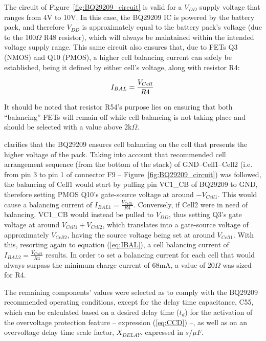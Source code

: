 The circuit of Figure~\ref{fig:BQ29209_circuit} is valid for a $V_{DD}$ supply voltage that ranges from 4V to 10V. In this case, the BQ29209 IC is powered by the battery pack, and therefore $V_{DD}$ is approximately equal to the battery pack's voltage (due to the 100$\Omega$ R48 resistor), which will always be maintained within the intended voltage supply range. This same circuit also ensures that, due to FETs Q3 (NMOS) and Q10 (PMOS), a higher cell balancing current can safely be established, being it defined by either cell's voltage, along with resistor R4:

\begin{equation}\label{eq:IBAL}
	I_{BAL}=\frac{V_{Cell}}{R4}\,\medskip
\end{equation}

\noindent It should be noted that resistor R54's purpose lies on ensuring that both ``balancing'' FETs will remain off while cell balancing is not taking place and should be selected with a value above 2k$\Omega$.

\cite{bq29209} clarifies that the BQ29209 ensures cell balancing on the cell that presents the higher voltage of the pack.
Taking into account that recommended cell arrangement sequence (from the bottom of the stack) of GND--Cell1--Cell2 (i.e. from pin 3 to pin 1 of connector F9 -- Figure~\ref{fig:BQ29209_circuit}) was followed, the balancing of Cell1 would start by pulling pin VC1\_CB of BQ29209 to GND, therefore setting PMOS Q10's gate-source voltage at around $-V_{Cell1}$. This would cause a balancing current of $I_{BAL1}=\frac{V_{Cell1}}{R4}$. Conversely, if Cell2 were in need of balancing, VC1\_CB would instead be pulled to $V_{DD}$, thus setting Q3's gate voltage at around $V_{Cell1}+V_{Cell2}$, which translates into a gate-source voltage of approximately $V_{Cell2}$, having the source voltage being set at around $V_{Cell1}$. With this, resorting again to equation (\ref{eq:IBAL}), a cell balancing current of $I_{BAL2}=\frac{V_{Cell2}}{R4}$ results. In order to set a balancing current for each cell that would always surpass the minimum charge current of 68mA, a value of 20$\Omega$ was sized for R4. 

The remaining components' values were selected as to comply with the BQ29209 recommended operating conditions, except for the delay time capacitance, C55, which can be calculated based on a desired delay time ($t_d$) for the activation of the overvoltage protection feature -- expression (\ref{eq:CCD}) --, as well as on an overvoltage delay time scale factor, $X_{DELAY}$, expressed in $s/ \mu F$.

